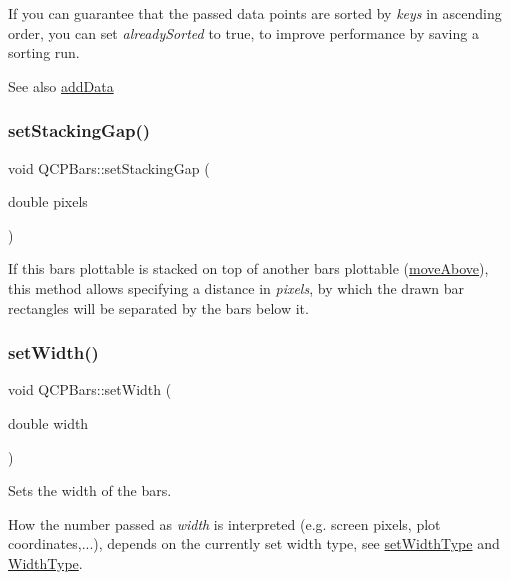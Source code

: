 If you can guarantee that the passed data points are sorted by {\itshape keys} in ascending order, you can set {\itshape already\+Sorted} to true, to improve performance by saving a sorting run.

\begin{DoxySeeAlso}{See also}
\hyperlink{class_q_c_p_bars_a323d6970d6d6e3166d89916a7f60f733}{add\+Data} 
\end{DoxySeeAlso}
\mbox{\label{class_q_c_p_bars_aeacf7561afb1c70284b22822b57c7bb5}} 
\subsubsection{\texorpdfstring{set\+Stacking\+Gap()}{setStackingGap()}}
{\footnotesize\ttfamily void Q\+C\+P\+Bars\+::set\+Stacking\+Gap (\begin{DoxyParamCaption}\item[{double}]{pixels }\end{DoxyParamCaption})}

If this bars plottable is stacked on top of another bars plottable (\hyperlink{class_q_c_p_bars_ac22e00a6a41509538c21b04f0a57318c}{move\+Above}), this method allows specifying a distance in {\itshape pixels}, by which the drawn bar rectangles will be separated by the bars below it. \mbox{\label{class_q_c_p_bars_afec6116579d44d5b706e0fa5e5332507}} 
\subsubsection{\texorpdfstring{set\+Width()}{setWidth()}}
{\footnotesize\ttfamily void Q\+C\+P\+Bars\+::set\+Width (\begin{DoxyParamCaption}\item[{double}]{width }\end{DoxyParamCaption})}

Sets the width of the bars.

How the number passed as {\itshape width} is interpreted (e.\+g. screen pixels, plot coordinates,...), depends on the currently set width type, see \hyperlink{class_q_c_p_bars_adcaa3b41281bb2c0f7949b341592fcc0}{set\+Width\+Type} and \hyperlink{class_q_c_p_bars_a65dbbf1ab41cbe993d71521096ed4649}{Width\+Type}. \mbox{\label{class_q_c_p_bars_adcaa3b41281bb2c0f7949b341592fcc0}} 
